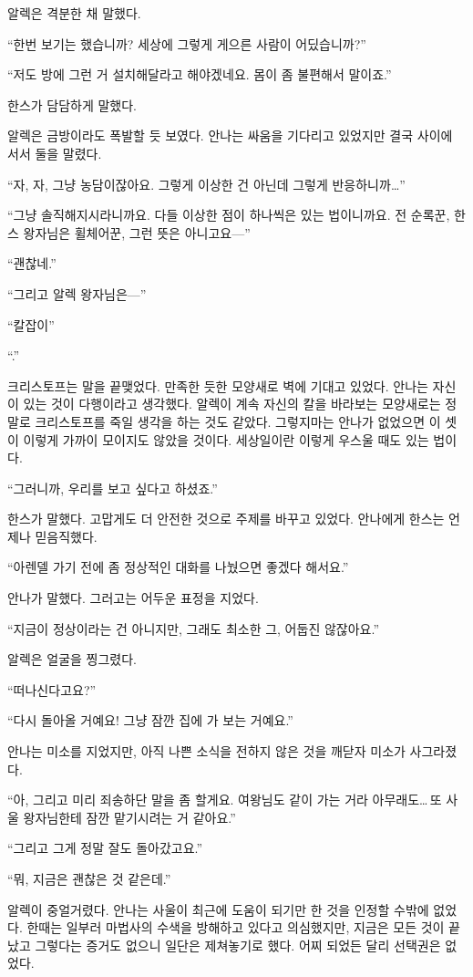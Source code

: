 알렉은 격분한 채 말했다.

``한번 보기는 했습니까? 세상에 그렇게 게으른 사람이 어딨습니까?''

``저도 방에 그런 거 설치해달라고 해야겠네요. 몸이 좀 불편해서 말이죠.''

한스가 담담하게 말했다.

알렉은 금방이라도 폭발할 듯 보였다. 안나는 싸움을 기다리고 있었지만 결국 사이에 서서 둘을 말렸다.

``자, 자, 그냥 농담이잖아요. 그렇게 이상한 건 아닌데 그렇게 반응하니까\ldots''

``그냥 솔직해지시라니까요. 다들 이상한 점이 하나씩은 있는 법이니까요. 전 순록꾼, 한스 왕자님은 휠체어꾼, 그런 뜻은 아니고요—''

``괜찮네.''

``그리고 알렉 왕자님은—''

``칼잡이''

``.''

크리스토프는 말을 끝맺었다. 만족한 듯한 모양새로 벽에 기대고 있었다. 안나는 자신이 있는 것이 다행이라고 생각했다. 알렉이 계속 자신의 칼을 바라보는 모양새로는 정말로 크리스토프를 죽일 생각을 하는 것도 같았다. 그렇지마는 안나가 없었으면 이 셋이 이렇게 가까이 모이지도 않았을 것이다. 세상일이란 이렇게 우스울 때도 있는 법이다.

``그러니까, 우리를 보고 싶다고 하셨죠.''

한스가 말했다. 고맙게도 더 안전한 것으로 주제를 바꾸고 있었다. 안나에게 한스는 언제나 믿음직했다.

``아렌델 가기 전에 좀 정상적인 대화를 나눴으면 좋겠다 해서요.''

안나가 말했다. 그러고는 어두운 표정을 지었다.

``지금이 정상이라는 건 아니지만, 그래도 최소한 그, 어둡진 않잖아요.''

알렉은 얼굴을 찡그렸다.

``떠나신다고요?''

``다시 돌아올 거예요! 그냥 잠깐 집에 가 보는 거예요.''

안나는 미소를 지었지만, 아직 나쁜 소식을 전하지 않은 것을 깨닫자 미소가 사그라졌다.

``아, 그리고 미리 죄송하단 말을 좀 할게요. 여왕님도 같이 가는 거라 아무래도\ldots\,또 사울 왕자님한테 잠깐 맡기시려는 거 같아요.''

``그리고 그게 정말 잘도 돌아갔고요.''

``뭐, 지금은 괜찮은 것 같은데.''

알렉이 중얼거렸다. 안나는 사울이 최근에 도움이 되기만 한 것을 인정할 수밖에 없었다. 한때는 일부러 마법사의 수색을 방해하고 있다고 의심했지만, 지금은 모든 것이 끝났고 그렇다는 증거도 없으니 일단은 제쳐놓기로 했다. 어찌 되었든 달리 선택권은 없었다.

